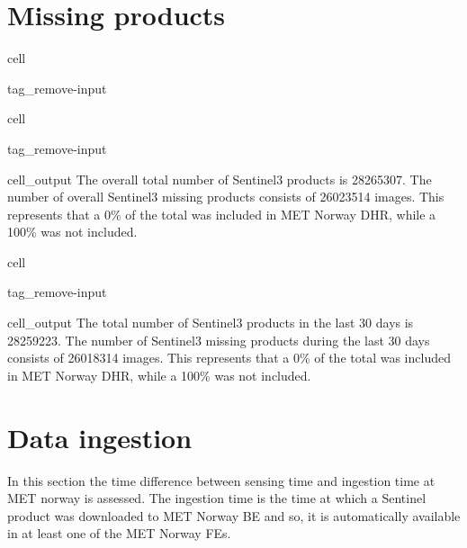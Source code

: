\documentclass[letterpaper,10pt,english]{jupyterBook}
\begin{document}
\section{Missing products}
\label{\detokenize{S3_portals:missing-products}}
\begin{sphinxuseclass}{cell}
\begin{sphinxuseclass}{tag_remove-input}
\end{sphinxuseclass}
\end{sphinxuseclass}
\begin{sphinxuseclass}{cell}
\begin{sphinxuseclass}{tag_remove-input}\begin{sphinxVerbatimOutput}

\begin{sphinxuseclass}{cell_output}
\sphinxAtStartPar
The overall total number of Sentinel\sphinxhyphen{}3 products is 28265307. The number of overall Sentinel\sphinxhyphen{}3 missing products consists of 26023514 images. This represents that a 0\% of the total was included in MET Norway DHR, while a 100\% was not included.

\end{sphinxuseclass}\end{sphinxVerbatimOutput}

\end{sphinxuseclass}
\end{sphinxuseclass}
\begin{sphinxuseclass}{cell}
\begin{sphinxuseclass}{tag_remove-input}\begin{sphinxVerbatimOutput}

\begin{sphinxuseclass}{cell_output}
\sphinxAtStartPar
The total number of Sentinel\sphinxhyphen{}3 products in the last 30 days is 28259223. The number of Sentinel\sphinxhyphen{}3 missing products during the last 30 days consists of 26018314 images. This represents that a 0\% of the total was included in MET Norway DHR, while a 100\% was not included.

\end{sphinxuseclass}\end{sphinxVerbatimOutput}

\end{sphinxuseclass}
\end{sphinxuseclass}

\section{Data ingestion}
\label{\detokenize{S3_portals:data-ingestion}}
\sphinxAtStartPar
In this section the time difference between sensing time and ingestion time at MET norway is assessed. The ingestion time is the time at which a Sentinel product was downloaded to MET Norway BE and so, it is automatically available in at least one of the MET Norway FEs.
\end{document}
